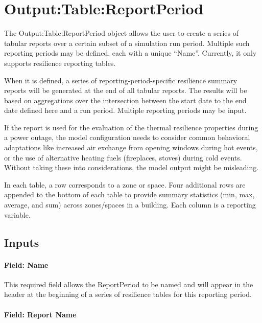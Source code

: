 \section{Output:Table:ReportPeriod}\label{outputtablereportperiod}

The Output:Table:ReportPeriod object allows the user to create a series of
tabular reports over a certain subset of a simulation run period. Multiple such
reporting periods may be defined, each with a unique ``Name''. Currently, it only
supports resilience reporting tables.

When it is defined, a series of reporting-period-specific resilience summary
reports will be generated at the end of all tabular reports. The results will be
based on aggregations over the intersection between the start date to the end
date defined here and a run period. Multiple reporting periods may be input.

If the report is used for the evaluation of the thermal resilience properties
during a power outage, the model configuration needs to consider common
behavioral adaptations like increased air exchange from opening windows during
hot events, or the use of alternative heating fuels (fireplaces, stoves) during
cold events. Without taking these into considerations, the model output might
be misleading.

In each table, a row corresponds to a zone or space. Four additional rows are
appended to the bottom of each table to provide summary statistics (min, max,
average, and sum) across zones/spaces in a building. Each column is a reporting
variable.

\subsection{Inputs}\label{inputs-074}

\paragraph{Field: Name}\label{field-name-066}

This required field allows the ReportPeriod to be named and will appear in the
header at the beginning of a series of resilience tables for this reporting
period.

\paragraph{Field: Report Name}\label{report-name-1}

